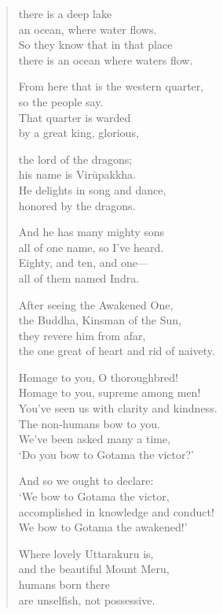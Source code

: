 \documentclass[12pt,openany]{book}%
\begin{document}
\begin{verse}
there is a deep lake \\
an ocean, where water flows. \\
So they know that in that place \\
there is an ocean where waters flow. 

From here that is the western quarter, \\
so the people say. \\
That quarter is warded \\
by a great king, glorious, 

the lord of the dragons; \\
his name is \textsanskrit{Virūpakkha}. \\
He delights in song and dance, \\
honored by the dragons. 

And he has many mighty sons \\
all of one name, so I’ve heard. \\
Eighty, and ten, and one—\\
all of them named Indra. 

After seeing the Awakened One, \\
the Buddha, Kinsman of the Sun, \\
they revere him from afar, \\
the one great of heart and rid of naivety. 

Homage to you, O thoroughbred! \\
Homage to you, supreme among men! \\
You’ve seen us with clarity and kindness. \\
The non-humans bow to you. \\
We’ve been asked many a time, \\
‘Do you bow to Gotama the victor?’ 

And so we ought to declare: \\
‘We bow to Gotama the victor, \\
accomplished in knowledge and conduct! \\
We bow to Gotama the awakened!’ 

Where lovely Uttarakuru is, \\
and the beautiful Mount Meru, \\
humans born there \\
are unselfish, not possessive. 


\end{verse}
\end{document}
